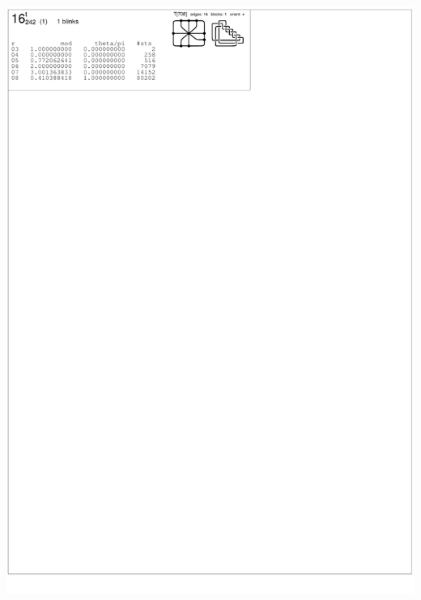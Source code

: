 \begin{center}
 \includegraphics[height=23.5cm]{E.figsbw2/con3catalog039_bw.pdf} \eject
\end{center}
 


